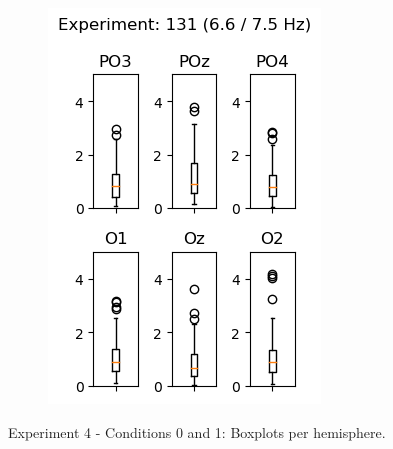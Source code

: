 \begin{figure}[ht]
\begin{subfigure}{0.25\textwidth}
        \includegraphics[width=\linewidth]{images/results/1316675.png}
        \label{fig:1316675}
    \end{subfigure}
    \caption{Experiment 4 - Conditions 0 and 1: Boxplots per hemisphere.}
    \label{fig:4-66/75}
\end{figure}
